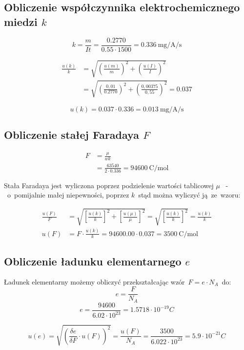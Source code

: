 \documentclass{fizraport}
\begin{document}
\subsection{Obliczenie współczynnika elektrochemicznego miedzi $k$}
$$k=\frac{m}{It}=\frac{0.2770}{0.55 \cdot 1500}= \SI{0.336}{\milli\gram\per\ampere\per\second}$$

\begin{align*}
	\frac{u(k)}{k} &= \sqrt{ \left(\frac{u(m)}{m} \right)^2 + \left(\frac{u(I)}{I} \right )^2 } \\
	&= \sqrt{ \left(\frac{0,01}{0.2770} \right)^2 + \left(\frac{0,00375}{0,55} \right )^2 }=0.037
\end{align*}

$$u(k) =  0.037  \cdot  0.336=\SI{0.013}{\milli\gram\per\ampere\per\second}$$

\subsection{Obliczenie stałej Faradaya $F$}

\begin{align*}
    F &= \frac{\mu}{wk} \\&= \frac{63540}{2 \cdot 0.336} = \SI{94600}{\coulomb\per\mol}
\end{align*}

Stała Faradaya jest~wyliczona poprzez podzielenie wartości tablicowej $\mu$ ~-~o~pomijalnie małej niepewności, poprzez $k$~stąd można wyliczyć ją~ze~wzoru:

\begin{align*}
	\frac{u(F)}{F} &= \sqrt{ \left[\frac{u(k)}{k} \right]^2 + \left[\frac{u(\mu)}{\mu} \right ]^2 } 
	=  \sqrt{ \left[\frac{u(k)}{k} \right]^2 } = \frac{u(k)}{k}\\
	u(F) &= F\cdot\frac{u(k)}{k}=  94600.00\cdot0.037 = \SI{3500}{\coulomb\per\mol}
\end{align*}
\subsection{Obliczenie ładunku elementarnego $e$}
Ładunek elementarny możemy obliczyć przekształcając wzór~$F=e \cdot N_A$~do:
$$e=\frac{F}{N_A}$$
$$e=\frac{94600}{6.02 \cdot 10^{23}}=1.5718 \cdot 10^{-19}C$$

$$u(e)=\sqrt{\left(\frac{\delta e}{\delta F} \cdot u(F) \right)^2}=\frac{u(F)}{N_A}=\frac{3500}{6.022 \cdot 10^{23}}= 5.9 \cdot 10^{-21}C$$

\newpage
\end{document}
